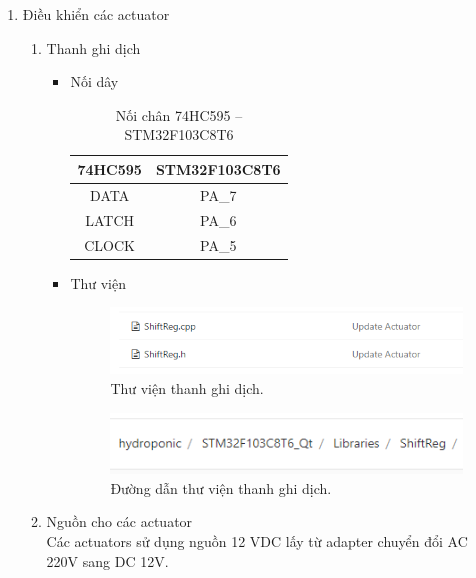 \documentclass[a4paper,12pt,oneside]{article}
\begin{document}
\begin{enumerate}
\begin{itemize}
	\end{itemize}
	
	\item Điều khiển các actuator
		\begin{enumerate}
			\item Thanh ghi dịch
			\begin{itemize}
			\item Nối dây
				\begin{table}[!htp]
    			\centering
				\begin{tabular}{|c|c|}
				\hline 
				74HC595 & STM32F103C8T6 \\ 
				\hline 
				DATA & PA\_7 \\ 
				\hline 
				LATCH & PA\_6 \\ 
				\hline 
				CLOCK & PA\_5 \\ 
				\hline 
				\end{tabular} 
    			\caption{Nối chân 74HC595 – STM32F103C8T6}
				\end{table}
			\item Thư viện
			\begin{figure}[H]
			\centering
			\includegraphics[scale=.7]{hinh/lib_register.PNG}
			\caption{Thư viện thanh ghi dịch.}
			\end{figure}
			
			\begin{figure}[H]
			\centering
			\includegraphics[scale=.7]{hinh/path_register.PNG}
			\caption{Đường dẫn thư viện thanh ghi dịch.}
			\end{figure}
			\end{itemize}
			
		\item Nguồn cho các actuator \\
		\noindent Các actuators sử dụng nguồn 12 VDC lấy từ adapter chuyển đổi AC 220V sang DC 12V.
		

\end{enumerate}
\end{enumerate}
\end{document}
